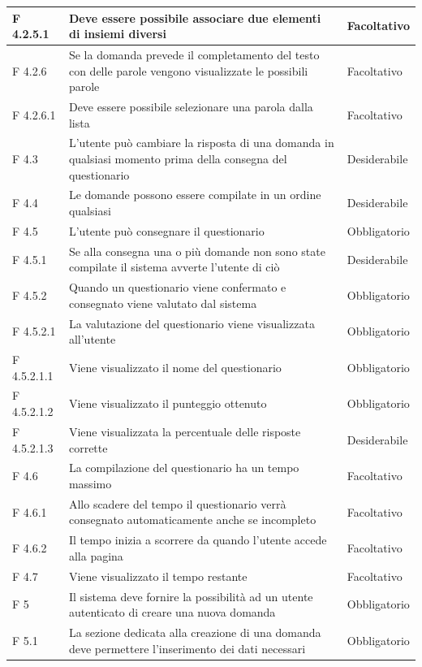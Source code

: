 \documentclass[a4paper,11pt]{article}
\begin{document}
\begin{longtable}{p{}p{}p{}}
\midrule
F 4.2.5.1 & Deve essere possibile associare due elementi di insiemi diversi & Facoltativo\\
\midrule
F 4.2.6 & Se la domanda prevede il completamento del testo con delle parole vengono visualizzate le possibili parole & Facoltativo\\
\midrule
F 4.2.6.1 & Deve essere possibile selezionare una parola dalla lista & Facoltativo\\
\midrule
F 4.3 & L'utente può cambiare la risposta di una domanda in qualsiasi momento prima della consegna del questionario & Desiderabile\\
\midrule
F 4.4 & Le domande possono essere compilate in un ordine qualsiasi & Desiderabile\\
\midrule
F 4.5 & L'utente può consegnare il questionario & Obbligatorio\\
\midrule
F 4.5.1 & Se alla consegna una o più domande non sono state compilate il sistema avverte l'utente di ciò & Desiderabile\\
\midrule
F 4.5.2 & Quando un questionario viene confermato e consegnato viene valutato dal sistema & Obbligatorio\\
\midrule
F 4.5.2.1 & La valutazione del questionario viene visualizzata all'utente & Obbligatorio\\
\midrule
F 4.5.2.1.1 & Viene visualizzato il nome del questionario & Obbligatorio\\
\midrule
F 4.5.2.1.2 & Viene visualizzato il punteggio ottenuto & Obbligatorio\\
\midrule
F 4.5.2.1.3 & Viene visualizzata la percentuale delle risposte corrette & Desiderabile\\
\midrule
F 4.6 & La compilazione del questionario ha un tempo massimo & Facoltativo\\
\midrule
F 4.6.1 & Allo scadere del tempo il questionario verrà consegnato automaticamente anche se incompleto & Facoltativo\\
\midrule
F 4.6.2 & Il tempo inizia a scorrere da quando l'utente accede alla pagina & Facoltativo\\
\midrule
F 4.7 & Viene visualizzato il tempo restante & Facoltativo\\
\midrule
F 5 & Il sistema deve fornire la possibilità ad un utente autenticato di creare una nuova domanda & Obbligatorio\\
\midrule
F 5.1 & La sezione dedicata alla creazione di una domanda deve permettere l'inserimento dei dati necessari & Obbligatorio\\

\end{longtable}
\end{document}
